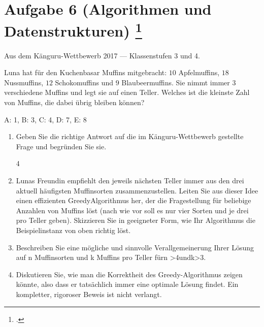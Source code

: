 \documentclass{lehramt-informatik-aufgabe}
\begin{document}

\section{Aufgabe 6 (Algorithmen und Datenstrukturen)
\footcite[Thema 1 Aufgabe 6 Seite 5]{examen:66115:2019:03}}

Aus dem Känguru-Wettbewerb 2017 — Klassenstufen 3 und 4.

Luna hat für den Kuchenbasar Muffins mitgebracht: $10$ Apfelmuffins,
$18$ Nussmuffins, $12$ Schokomuffins und $9$ Blaubeermuffins. Sie nimmt
immer $3$ verschiedene Muffins und legt sie auf einen Teller. Welches
ist die kleinste Zahl von Muffins, die dabei übrig bleiben können?

A: 1, B: 3, C: 4, D: 7, E: 8

\begin{enumerate}
\item Geben Sie die richtige Antwort auf die im Känguru-Wettbewerb
gestellte Frage und begründen Sie sie.

\begin{liAntwort}
4
\end{liAntwort}

\item Lunas Freundin empfiehlt den jeweils nächsten Teller immer aus den
drei aktuell häufigsten Muffinsorten zusammenzustellen. Leiten Sie aus
dieser Idee einen effizienten GreedyAlgorithmus her, der die
Fragestellung für beliebige Anzahlen von Muffins löst (nach wie vor soll
es nur vier Sorten und je drei pro Teller geben). Skizzieren Sie in
geeigneter Form, wie Ihr Algorithmus die Beispielinstanz von oben
richtig löst.

\item Beschreiben Sie eine mögliche und sinnvolle Verallgemeinerung
Ihrer Lösung auf n Muffinsorten und k Muffins pro Teller fürn >4undk>3.

\item Diskutieren Sie, wie man die Korrektheit des Greedy-Algorithmus
zeigen könnte, also dass er tatsächlich immer eine optimale Lösung
findet. Ein kompletter, rigoroser Beweis ist nicht verlangt.
\end{enumerate}
\end{document}
